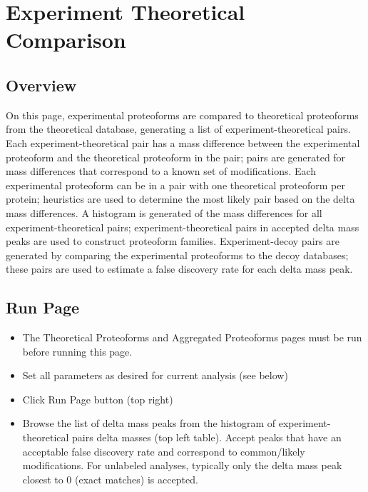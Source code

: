 
\section{Experiment Theoretical Comparison}

\subsection{Overview}

On this page, experimental proteoforms are compared to theoretical proteoforms from the theoretical database, generating a list of experiment-theoretical pairs. Each experiment-theoretical pair has a mass difference between the experimental proteoform and the theoretical proteoform in the pair; pairs are generated for mass differences that correspond to a known set of modifications. Each experimental proteoform can be in a pair with one theoretical proteoform per protein; heuristics are used to determine the most likely pair based on the delta mass differences. A histogram is generated of the mass differences for all experiment-theoretical pairs; experiment-theoretical pairs in accepted delta mass peaks are used to construct proteoform families. Experiment-decoy pairs are generated by comparing the experimental proteoforms to the decoy databases; these pairs are used to estimate a false discovery rate for each delta mass peak. 

\subsection{Run Page}
\begin{itemize}
\item The Theoretical Proteoforms and Aggregated Proteoforms pages must be run before running this page.
\item Set all parameters as desired for current analysis (see below)
\item Click Run Page button (top right)
\item Browse the list of delta mass peaks from the histogram of experiment-theoretical pairs delta masses (top left table). Accept peaks that have an acceptable false discovery rate and correspond to common/likely modifications. For unlabeled analyses, typically only the delta mass peak closest to 0 (exact matches) is accepted. 
\end{itemize}

